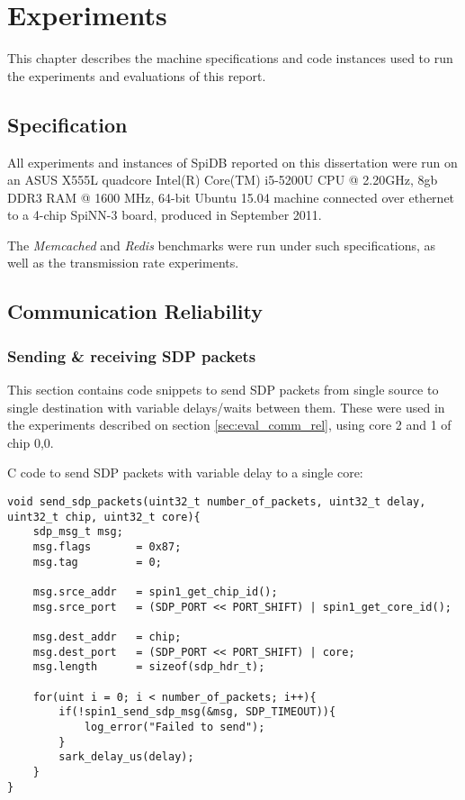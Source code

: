 \chapter{Experiments}
This chapter describes the machine specifications and code instances used to run the experiments and evaluations of this report.

\section{Specification}
\label{sec:appendix-specs}
All experiments and instances of SpiDB reported on this dissertation were run on an ASUS X555L quadcore Intel(R) Core(TM) i5-5200U CPU @ 2.20GHz, 8gb DDR3 RAM @ 1600 MHz, 64-bit Ubuntu 15.04 machine connected over ethernet to a 4-chip SpiNN-3 board, produced in September 2011.

The \textit{Memcached} and \textit{Redis} benchmarks were run under such specifications, as well as the transmission rate experiments.

\section{Communication Reliability}
\label{sec:appendix_comm_rel}

\subsection{Sending \& receiving SDP packets}

This section contains code snippets to send SDP packets from single source to single destination with variable delays/waits between them. These were used in the experiments described on section \ref{sec:eval_comm_rel}, using core 2 and 1 of chip 0,0.

C code to send SDP packets with variable delay to a single core:

\begin{lstlisting}[caption={Source}]
void send_sdp_packets(uint32_t number_of_packets, uint32_t delay, uint32_t chip, uint32_t core){
	sdp_msg_t msg;
    msg.flags       = 0x87;
    msg.tag         = 0;

    msg.srce_addr   = spin1_get_chip_id();
    msg.srce_port   = (SDP_PORT << PORT_SHIFT) | spin1_get_core_id();

    msg.dest_addr   = chip;
    msg.dest_port   = (SDP_PORT << PORT_SHIFT) | core;
    msg.length 		= sizeof(sdp_hdr_t);

    for(uint i = 0; i < number_of_packets; i++){
    	if(!spin1_send_sdp_msg(&msg, SDP_TIMEOUT)){
        	log_error("Failed to send");
        }
        sark_delay_us(delay);
    }
}
\end{lstlisting}

